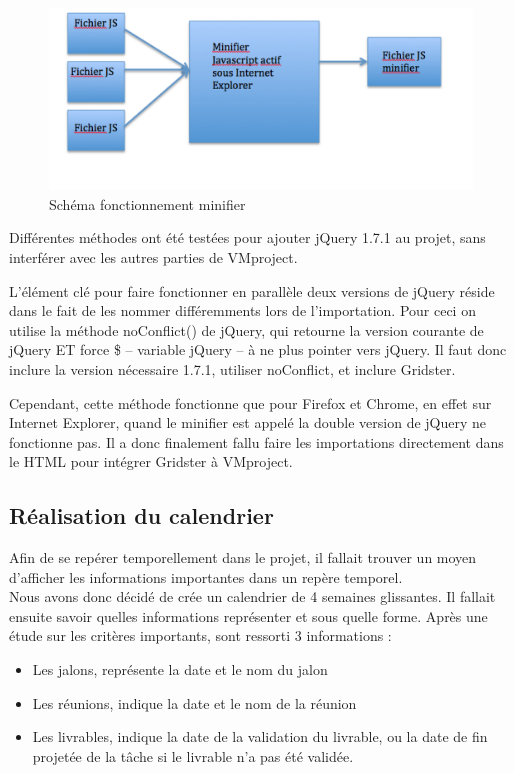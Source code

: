 \documentclass[12pt]{report}
\begin{document}
	\begin{figure}[H]
	\centering
	\includegraphics[width=1\textwidth]{pictures/matthieu/m_minifier.png}
	\caption{Schéma fonctionnement minifier}
	\label{w2}
\end{figure}
	
Différentes méthodes ont été testées pour ajouter jQuery 1.7.1 au projet, sans interférer avec les autres parties de VMproject.

L’élément clé pour faire fonctionner en parallèle deux versions de jQuery réside dans le fait de les nommer différemments lors de l’importation. Pour ceci on utilise la méthode noConflict() de jQuery, qui retourne la version courante de jQuery ET force \$ -- variable jQuery -- à ne plus pointer vers jQuery. Il faut donc inclure la version nécessaire 1.7.1, utiliser noConflict, et inclure Gridster.

Cependant, cette méthode fonctionne que pour Firefox et Chrome, en effet sur Internet Explorer, quand le minifier est appelé la double version de jQuery ne fonctionne pas. Il a donc finalement fallu faire les importations directement dans le HTML pour intégrer Gridster à VMproject.

	\subsection{Réalisation du calendrier}
	
Afin de se repérer temporellement dans le projet, il fallait trouver un moyen d’afficher les informations importantes dans un repère temporel.\\

Nous avons donc décidé de crée un calendrier de 4 semaines glissantes. Il fallait ensuite savoir quelles informations représenter et sous quelle forme. Après une étude sur les critères importants, sont ressorti 3 informations :\\
	
	\begin{itemize}
\item	Les jalons, représente la date et le nom du jalon
\item	Les réunions, indique la date et le nom de la réunion
\item	Les livrables, indique la date de la validation du livrable, ou la date de fin projetée de la tâche si le livrable n’a pas été validée.\\
	\end{itemize}
\end{document}
